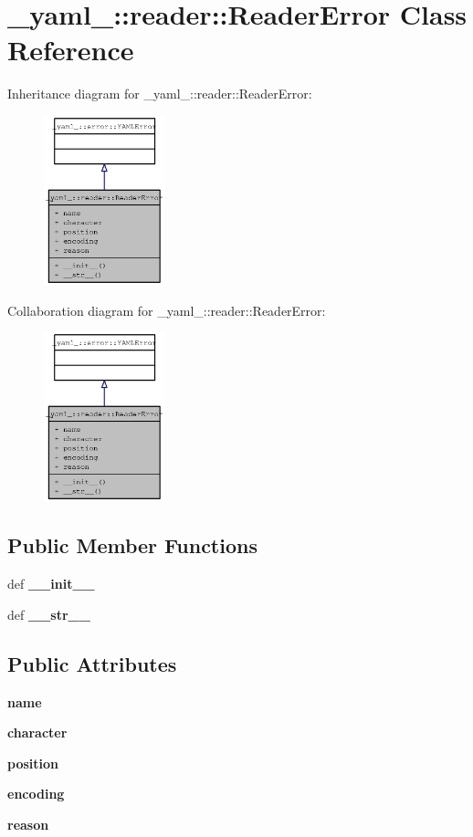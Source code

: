 \section{\_\-yaml\_\-::reader::ReaderError Class Reference}
\label{class__yaml___1_1reader_1_1ReaderError}
Inheritance diagram for \_\-yaml\_\-::reader::ReaderError:\nopagebreak
\begin{figure}[H]
\begin{center}
\leavevmode
\includegraphics[width=99pt]{class__yaml___1_1reader_1_1ReaderError__inherit__graph}
\end{center}
\end{figure}
Collaboration diagram for \_\-yaml\_\-::reader::ReaderError:\nopagebreak
\begin{figure}[H]
\begin{center}
\leavevmode
\includegraphics[width=99pt]{class__yaml___1_1reader_1_1ReaderError__coll__graph}
\end{center}
\end{figure}
\subsection*{Public Member Functions}
\begin{CompactItemize}
\item 
def {\bf \_\-\_\-init\_\-\_\-}
\item 
def {\bf \_\-\_\-str\_\-\_\-}
\end{CompactItemize}
\subsection*{Public Attributes}
\begin{CompactItemize}
\item 
{\bf name}
\item 
{\bf character}
\item 
{\bf position}
\item 
{\bf encoding}
\item 
{\bf reason}
\end{CompactItemize}


